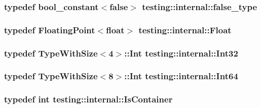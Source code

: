 \subsubsection[{false\+\_\+type}]{\setlength{\rightskip}{0pt plus 5cm}typedef {\bf bool\+\_\+constant}$<$false$>$ {\bf testing\+::internal\+::false\+\_\+type}}\label{namespacetesting_1_1internal_abb1d0789f19bdde21affccbd1078b525}
\hypertarget{namespacetesting_1_1internal_a02e1981f5ff70609e6ac06e006ff519a}{}
\subsubsection[{Float}]{\setlength{\rightskip}{0pt plus 5cm}typedef {\bf Floating\+Point}$<$float$>$ {\bf testing\+::internal\+::\+Float}}\label{namespacetesting_1_1internal_a02e1981f5ff70609e6ac06e006ff519a}
\hypertarget{namespacetesting_1_1internal_a8ee38faaf875f133358abaf9bc056cec}{}
\subsubsection[{Int32}]{\setlength{\rightskip}{0pt plus 5cm}typedef {\bf Type\+With\+Size}$<$4$>$\+::Int {\bf testing\+::internal\+::\+Int32}}\label{namespacetesting_1_1internal_a8ee38faaf875f133358abaf9bc056cec}
\hypertarget{namespacetesting_1_1internal_a271c563fec38b804ddab0677f51f70a8}{}
\subsubsection[{Int64}]{\setlength{\rightskip}{0pt plus 5cm}typedef {\bf Type\+With\+Size}$<$8$>$\+::Int {\bf testing\+::internal\+::\+Int64}}\label{namespacetesting_1_1internal_a271c563fec38b804ddab0677f51f70a8}
\hypertarget{namespacetesting_1_1internal_ad8f0c2883245f1df2a53618a49f0deb3}{}
\subsubsection[{Is\+Container}]{\setlength{\rightskip}{0pt plus 5cm}typedef int {\bf testing\+::internal\+::\+Is\+Container}}\label{namespacetesting_1_1internal_ad8f0c2883245f1df2a53618a49f0deb3}
\hypertarget{namespacetesting_1_1internal_abf080521ce135deb510e0a7830fd3d33}{}
